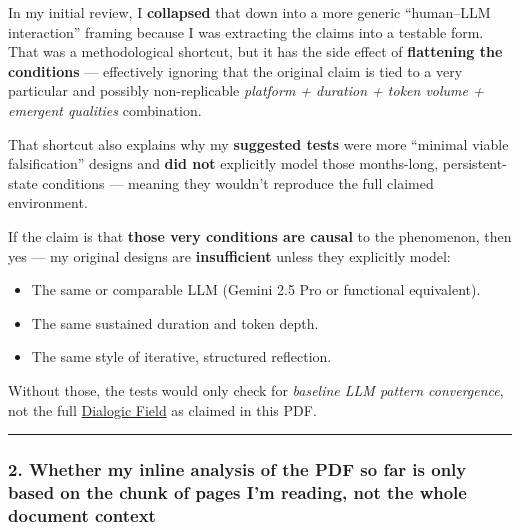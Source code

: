 \documentclass{article}
\begin{document}
In my initial review, I \textbf{collapsed} that down into a more generic ``human--LLM interaction'' framing because I was extracting the claims into a testable form. That was a methodological shortcut, but it has the side effect of \textbf{flattening the conditions} --- effectively ignoring that the original claim is tied to a very particular and possibly non-replicable \emph{platform + duration + token volume + emergent qualities} combination.

That shortcut also explains why my \textbf{suggested tests} were more ``minimal viable falsification'' designs and \textbf{did not} explicitly model those months-long, persistent-state conditions --- meaning they wouldn't reproduce the full claimed environment.

If the claim is that \textbf{those very conditions are causal} to the phenomenon, then yes --- my original designs are \textbf{insufficient} unless they explicitly model:

\begin{itemize}
\item
  The same or comparable LLM (Gemini 2.5 Pro or functional equivalent).
\item
  The same sustained duration and token depth.
\item
  The same style of iterative, structured reflection.
\end{itemize}

Without those, the tests would only check for \emph{baseline LLM pattern convergence}, not the full \hyperlink{gloss:dialogic_field}{Dialogic Field} as claimed in this PDF.

\begin{center}\rule{0.5\linewidth}{0.5pt}\end{center}

\subsubsection*{\texorpdfstring{\textbf{2. Whether my inline analysis of the PDF so far is only based on the chunk of pages I'm reading, not the whole document context}}{2. Whether my inline analysis of the PDF so far is only based on the chunk of pages I'm reading, not the whole document context}}\label{whether-my-inline-analysis-of-the-pdf-so-far-is-only-based-on-the-chunk-of-pages-im-reading-not-the-whole-document-context}
\end{document}
